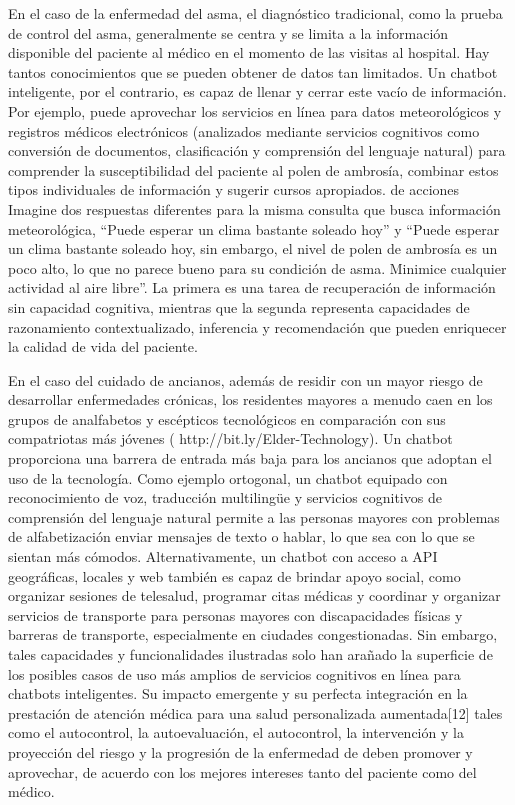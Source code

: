 En el caso de la enfermedad del asma, el diagnóstico tradicional, como la prueba de control del asma, generalmente se centra y se limita a la información disponible del paciente al médico en el momento de las visitas al hospital. Hay tantos conocimientos que se pueden obtener de datos tan limitados. Un chatbot inteligente, por el contrario, es capaz de llenar y cerrar este vacío de información. Por ejemplo, puede aprovechar los servicios en línea para datos meteorológicos y registros médicos electrónicos (analizados mediante servicios cognitivos como conversión de documentos, clasificación y comprensión del lenguaje natural) para comprender la susceptibilidad del paciente al polen de ambrosía, combinar estos tipos individuales de información y sugerir cursos apropiados. de acciones Imagine dos respuestas diferentes para la misma consulta que busca información meteorológica, “Puede esperar un clima bastante soleado hoy” y “Puede esperar un clima bastante soleado hoy, sin embargo, el nivel de polen de ambrosía es un poco alto, lo que no parece bueno para su condición de asma. Minimice cualquier actividad al aire libre”. La primera es una tarea de recuperación de información sin capacidad cognitiva, mientras que la segunda representa capacidades de razonamiento contextualizado, inferencia y recomendación que pueden enriquecer la calidad de vida del paciente.

En el caso del cuidado de ancianos, además de residir con un mayor riesgo de desarrollar enfermedades crónicas, los residentes mayores a menudo caen en los grupos de analfabetos y escépticos tecnológicos en comparación con sus compatriotas más jóvenes ( http://bit.ly/Elder-Technology). Un chatbot proporciona una barrera de entrada más baja para los ancianos que adoptan el uso de la tecnología. Como ejemplo ortogonal, un chatbot equipado con reconocimiento de voz, traducción multilingüe y servicios cognitivos de comprensión del lenguaje natural permite a las personas mayores con problemas de alfabetización enviar mensajes de texto o hablar, lo que sea con lo que se sientan más cómodos. Alternativamente, un chatbot con acceso a API geográficas, locales y web también es capaz de brindar apoyo social, como organizar sesiones de telesalud, programar citas médicas y coordinar y organizar servicios de transporte para personas mayores con discapacidades físicas y barreras de transporte, especialmente en ciudades congestionadas. Sin embargo, tales capacidades y funcionalidades ilustradas solo han arañado la superficie de los posibles casos de uso más amplios de servicios cognitivos en línea para chatbots inteligentes. Su impacto emergente y su perfecta integración en la prestación de atención médica para una salud personalizada aumentada[12] tales como el autocontrol, la autoevaluación, el autocontrol, la intervención y la proyección del riesgo y la progresión de la enfermedad de deben promover y aprovechar, de acuerdo con los mejores intereses tanto del paciente como del médico.

